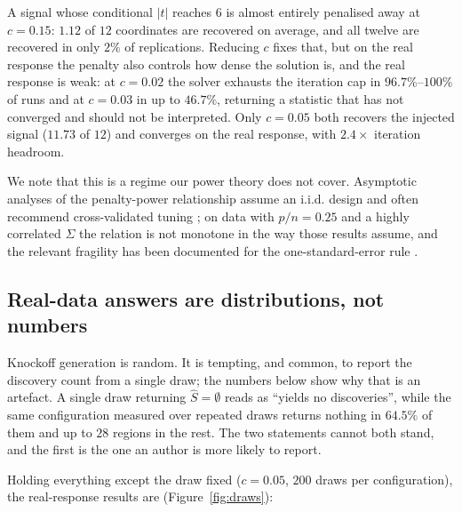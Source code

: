 \documentclass[11pt,a4paper]{article}
\begin{document}
\noindent
A signal whose conditional $|t|$ reaches $6$ is almost entirely penalised
away at $c=0.15$: $1.12$ of $12$ coordinates are recovered on average, and
all twelve are recovered in only $2\%$ of replications. Reducing $c$ fixes
that, but on the real response the penalty also controls how dense the
solution is, and the real response is weak: at $c=0.02$ the solver exhausts
the iteration cap in $96.7\%$--$100\%$ of runs and at $c=0.03$ in up to
$46.7\%$, returning a statistic that has not converged and should not be
interpreted. Only $c=0.05$ both recovers the injected signal ($11.73$ of
$12$) and converges on the real response, with $2.4\times$ iteration
headroom.

We note that this is a regime our power theory does not cover. Asymptotic
analyses of the penalty-power relationship assume an i.i.d. design and often
recommend cross-validated tuning \citep{weinstein2023power}; on data with
$p/n=0.25$ and a highly correlated $\Sigma$ the relation is not monotone in
the way those results assume, and the relevant fragility has been documented
for the one-standard-error rule \citep{candes2018panning}.

\subsection{Real-data answers are distributions, not numbers}
\label{sec:draws}

Knockoff generation is random. It is tempting, and common, to report the
discovery count from a single draw; the numbers below show why that is an
artefact. A single draw returning $\hat S=\emptyset$ reads as ``yields no
discoveries'', while the same configuration measured over repeated draws
returns nothing in $64.5\%$ of them and up to $28$ regions in the rest. The
two statements cannot both stand, and the first is the one an author is more
likely to report.

Holding everything except the draw fixed ($c=0.05$, $200$ draws per
configuration), the real-response results are (Figure~\ref{fig:draws}):
\end{document}
